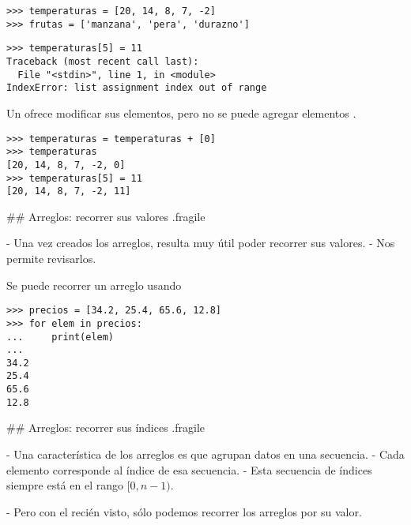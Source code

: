 \begin{lstlisting}[style=frame03]
>>> temperaturas = [20, 14, 8, 7, -2]
>>> frutas = ['manzana', 'pera', 'durazno']
\end{lstlisting}


\vspace{-2ex}

\bgncolumns
{}

\begin{lstlisting}[style=frame03]
>>> temperaturas[5] = 11
Traceback (most recent call last):
  File "<stdin>", line 1, in <module>
IndexError: list assignment index out of range
\end{lstlisting}


\bgnblockalert
\footnotesize
Un  ofrece modificar sus elementos, pero no se puede agregar elementos .
\trmblockalert

\trmcolumns

\begin{lstlisting}[style=frame03]
>>> temperaturas = temperaturas + [0]
>>> temperaturas
[20, 14, 8, 7, -2, 0]
>>> temperaturas[5] = 11
[20, 14, 8, 7, -2, 11]
\end{lstlisting}

## Arreglos: recorrer sus valores {.fragile}

- Una vez creados los arreglos, resulta muy útil poder recorrer sus valores.
    - Nos permite revisarlos.

\pause

\bgnblockdefinition
Se puede recorrer un arreglo usando 
\trmblockdefinition

\begin{lstlisting}[style=frame03]
>>> precios = [34.2, 25.4, 65.6, 12.8]
>>> for elem in precios:
...     print(elem)
... 
34.2
25.4
65.6
12.8
\end{lstlisting}

## Arreglos: recorrer sus índices {.fragile}

- Una característica  de los arreglos es que agrupan datos en una secuencia.
- Cada elemento corresponde al índice  de esa secuencia.
    - Esta secuencia de índices siempre está en el rango $[0, n-1)$.

\pause

- Pero con el  recién visto, sólo podemos recorrer los arreglos por su valor.

